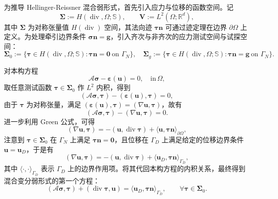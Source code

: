 为推导 Hellinger-Reissner 混合弱形式，首先引入应力与位移的函数空间。记
\[
\boldsymbol{\Sigma} := {H}(\operatorname{div},\Omega;\mathbb{S}),\qquad\boldsymbol{V} := L^2(\Omega;\mathbb{R}^d),
\]
其中 $\boldsymbol{\Sigma}$ 为对称张量值 $H(\operatorname{div})$ 空间，其法向迹 $\boldsymbol{\tau}\boldsymbol{n}$ 可通过迹定理在边界 $\partial\Omega$ 上定义。为处理牵引边界条件 $\boldsymbol{\sigma}\boldsymbol{n}=\boldsymbol{g}$，引入齐次与非齐次的应力测试空间与试探空间：
\[
\boldsymbol{\Sigma}_0 :=\big\{\boldsymbol{\tau}\in{H}(\operatorname{div},\Omega;\mathbb{S}) : \boldsymbol{\tau}\boldsymbol{n}=\boldsymbol{0}\ \text{on }\Gamma_N\big\}, \quad \boldsymbol{\Sigma}_g :=\big\{\boldsymbol{\tau}\in{H}(\operatorname{div},\Omega;\mathbb{S}): \boldsymbol{\tau}\boldsymbol{n}=\boldsymbol{g}\ \text{on }\Gamma_N\big\}.
\]

对本构方程
\[
\mathcal{A}\boldsymbol{\sigma} - \boldsymbol{\varepsilon}(\boldsymbol{u}) = 0,\quad\text{in}\,\Omega,
\]
取任意测试函数 $\boldsymbol{\tau}\in\boldsymbol{\Sigma}_0$ 作 $L^2$ 内积，得到
\[
(\mathcal{A}\boldsymbol{\sigma},\boldsymbol{\tau}) - (\boldsymbol{\varepsilon}(\boldsymbol{u}),\boldsymbol{\tau}) = 0,
\]
由于 $\boldsymbol{\tau}$ 为对称张量，满足 $(\boldsymbol{\varepsilon}(\boldsymbol{u}),\boldsymbol{\tau}) = (\nabla\boldsymbol{u},\boldsymbol{\tau})$，故有
\[
(\mathcal{A}\boldsymbol{\sigma},\boldsymbol{\tau}) - (\nabla\boldsymbol{u},\boldsymbol{\tau}) = 0.
\]
进一步利用 Green 公式，可得
\[
(\nabla\boldsymbol{u},\boldsymbol{\tau}) = -(\boldsymbol{u},\operatorname{div}\boldsymbol{\tau}) + \langle\boldsymbol{u},\boldsymbol{\tau}\boldsymbol{n}\rangle_{\partial\Omega},
\]
注意到 $\boldsymbol{\tau}\in\boldsymbol{\Sigma}_{0}$ 在 $\Gamma_{N}$ 上满足 $\boldsymbol{\tau}\boldsymbol{n} = \boldsymbol{0}$，且位移在 $\Gamma_D$ 上满足给定的位移边界条件 $\boldsymbol{u} = \boldsymbol{u}_{D}$，于是有
\[
(\nabla\boldsymbol{u},\boldsymbol{\tau}) =-(\boldsymbol{u},\operatorname{div}\boldsymbol{\tau}) +\langle\boldsymbol{u}_D,\boldsymbol{\tau}\boldsymbol{n}\rangle_{\Gamma_D},
\]
其中 $\langle\cdot,\cdot\rangle_{\Gamma_D}$ 表示 $\Gamma_D$ 上的边界作用项。将其代回本构方程的内积关系，最终得到混合变分弱形式的第一个方程：
\begin{equation}
	(\mathcal{A}\boldsymbol{\sigma},\boldsymbol{\tau}) + (\operatorname{div}\boldsymbol{\tau}, \boldsymbol{u}) = \langle\boldsymbol{u}_D,\boldsymbol{\tau}\boldsymbol{n}\rangle_{\Gamma_D},\qquad\forall\boldsymbol{\tau}\in\boldsymbol{\Sigma}_0.
	\label{eq:ch5_weak_form_part1}
\end{equation}

